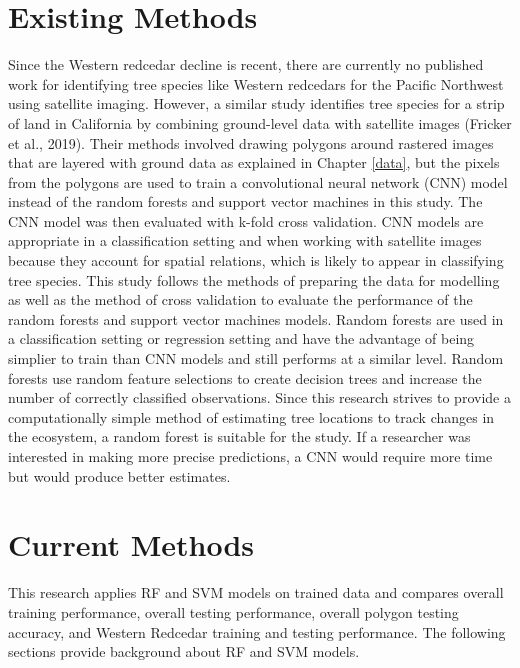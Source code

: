 \documentclass[12pt,twoside]{reedthesis}
\begin{document}
\hypertarget{existing-methods}{%
\section{Existing Methods}\label{existing-methods}}

Since the Western redcedar decline is recent, there are currently no published work for identifying tree species like Western redcedars for the Pacific Northwest using satellite imaging. However, a similar study identifies tree species for a strip of land in California by combining ground-level data with satellite images (Fricker et al., 2019). Their methods involved drawing polygons around rastered images that are layered with ground data as explained in Chapter \ref{data}, but the pixels from the polygons are used to train a convolutional neural network (CNN) model instead of the random forests and support vector machines in this study. The CNN model was then evaluated with k-fold cross validation. CNN models are appropriate in a classification setting and when working with satellite images because they account for spatial relations, which is likely to appear in classifying tree species. This study follows the methods of preparing the data for modelling as well as the method of cross validation to evaluate the performance of the random forests and support vector machines models. Random forests are used in a classification setting or regression setting and have the advantage of being simplier to train than CNN models and still performs at a similar level. Random forests use random feature selections to create decision trees and increase the number of correctly classified observations. Since this research strives to provide a computationally simple method of estimating tree locations to track changes in the ecosystem, a random forest is suitable for the study. If a researcher was interested in making more precise predictions, a CNN would require more time but would produce better estimates.

\hypertarget{current-methods}{%
\section{Current Methods}\label{current-methods}}

This research applies RF and SVM models on trained data and compares overall training performance, overall testing performance, overall polygon testing accuracy, and Western Redcedar training and testing performance. The following sections provide background about RF and SVM models.
\end{document}
